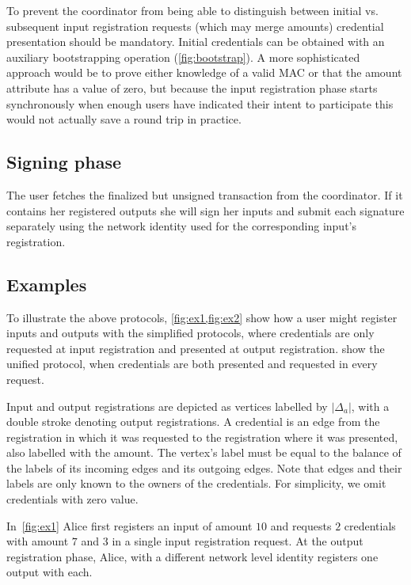 \documentclass[a4paper]{article}
\begin{document}
To prevent the coordinator from being able to distinguish between initial vs. subsequent input registration requests (which may merge amounts) credential presentation should be mandatory. Initial credentials can be obtained with an auxiliary bootstrapping operation (\cref{fig:bootstrap}). A more sophisticated approach would be to prove either knowledge of a valid MAC or that the amount attribute has a value of zero, but because the input registration phase starts synchronously when enough users have indicated their intent to participate this would not actually save a round trip in practice.

\subsection{Signing phase}

The user fetches the finalized but unsigned transaction from the coordinator. If it contains her registered outputs she will sign her inputs and submit each signature separately using the network identity used for the corresponding input's registration.

\subsection{Examples}\label{sec:examples}

To illustrate the above protocols, \cref{fig:ex1,fig:ex2} show how a user might register inputs and outputs with the simplified protocols, where credentials are only requested at input registration and presented at output registration.  show the unified protocol, when credentials are both presented and requested in every request.

Input and output registrations are depicted as vertices labelled by $|\Delta_a|$, with a double stroke denoting output registrations. A credential is an edge from the registration in which it was requested to the registration where it was presented, also labelled with the amount. The vertex's label must be equal to the balance of the labels of its incoming edges and its outgoing edges. Note that edges and their labels are only known to the owners of the credentials. For simplicity, we omit credentials with zero value.

In~\cref{fig:ex1} Alice first registers an input of amount $10$ and requests $2$ credentials with amount $7$ and $3$ in a single input registration request. At the output registration phase, Alice, with a different network level identity registers one output with each.
\end{document}
